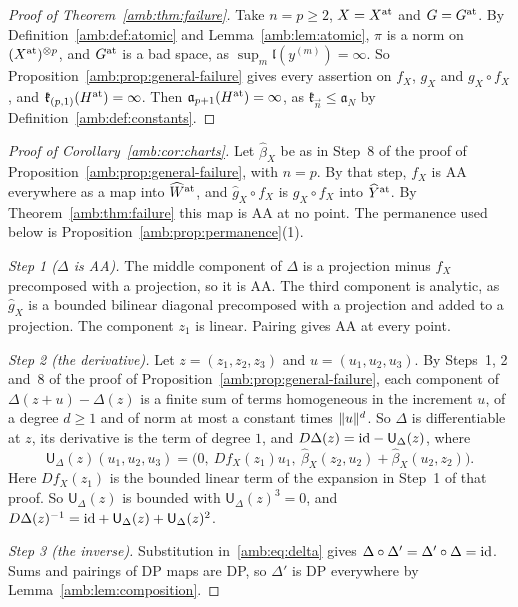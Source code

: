 \begin{proof}[Proof of Theorem~\ref{amb:thm:failure}]
Take $n=p\ge2$, $X=X^{\rm at}$ and $G=G^{\rm at}$. By Definition~\ref{amb:def:atomic} and Lemma~\ref{amb:lem:atomic}, $\pi$ is a norm on $(X^{\rm at})^{\otimes p}$, and $G^{\rm at}$ is a bad space, as $\sup_m\mathfrak l(y^{(m)})=\infty$. So Proposition~\ref{amb:prop:general-failure} gives every assertion on $f_X$, $g_X$ and $g_X\circ f_X$, and $\mathfrak k_{(p,1)}(H^{\rm at})=\infty$. Then $\mathfrak a_{p+1}(H^{\rm at})=\infty$, as $\mathfrak k_{\vec n}\le\mathfrak a_N$ by Definition~\ref{amb:def:constants}.
\end{proof}

\begin{proof}[Proof of Corollary~\ref{amb:cor:charts}]
Let $\hat\beta_X$ be as in Step~8 of the proof of Proposition~\ref{amb:prop:general-failure}, with $n=p$. By that step, $f_X$ is AA everywhere as a map into $\widehat W^{\rm at}$, and $\hat g_X\circ f_X$ is $g_X\circ f_X$ into $\widehat Y^{\rm at}$. By Theorem~\ref{amb:thm:failure} this map is AA at no point. The permanence used below is Proposition~\ref{amb:prop:permanence}(1).

\emph{Step 1 ($\Delta$ is AA).} The middle component of $\Delta$ is a projection minus $f_X$ precomposed with a projection, so it is AA. The third component is analytic, as $\hat g_X$ is a bounded bilinear diagonal precomposed with a projection and added to a projection. The component $z_1$ is linear. Pairing gives AA at every point.

\emph{Step 2 (the derivative).} Let $z=(z_1,z_2,z_3)$ and $u=(u_1,u_2,u_3)$. By Steps~1, 2 and~8 of the proof of Proposition~\ref{amb:prop:general-failure}, each component of $\Delta(z+u)-\Delta(z)$ is a finite sum of terms homogeneous in the increment $u$, of a degree $d\ge1$ and of norm at most a constant times $\lVert u\rVert^d$. So $\Delta$ is differentiable at $z$, its derivative is the term of degree $1$, and $D\Delta(z)=\mathrm{id}-\mathsf U_\Delta(z)$, where
\[
 \mathsf U_\Delta(z)(u_1,u_2,u_3)=\bigl(0,\ Df_X(z_1)u_1,\ \hat\beta_X(z_2,u_2)+\hat\beta_X(u_2,z_2)\bigr).
\]
Here $Df_X(z_1)$ is the bounded linear term of the expansion in Step~1 of that proof. So $\mathsf U_\Delta(z)$ is bounded with $\mathsf U_\Delta(z)^3=0$, and $D\Delta(z)^{-1}=\mathrm{id}+\mathsf U_\Delta(z)+\mathsf U_\Delta(z)^2$.

\emph{Step 3 (the inverse).} Substitution in~\eqref{amb:eq:delta} gives $\Delta\circ\Delta'=\Delta'\circ\Delta=\mathrm{id}$. Sums and pairings of DP maps are DP, so $\Delta'$ is DP everywhere by Lemma~\ref{amb:lem:composition}.


\end{proof}
